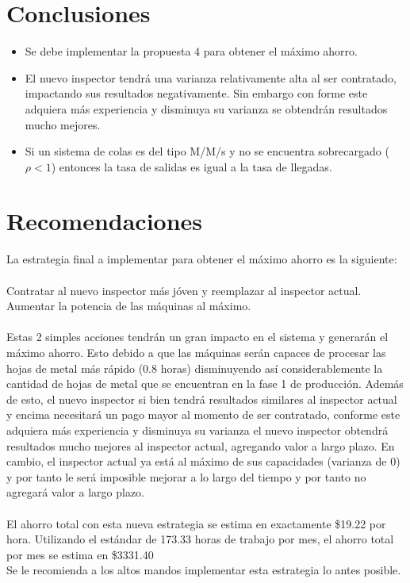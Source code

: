 \documentclass{article}
\begin{document}
\section{Conclusiones}
\begin{itemize}
	\item Se debe implementar la propuesta 4 para obtener el máximo ahorro.
	\item El nuevo inspector tendrá una varianza relativamente alta al
		ser contratado, impactando sus resultados negativamente. Sin embargo
		con forme este adquiera más experiencia y disminuya su varianza
		se obtendrán resultados mucho mejores.
	\item Si un sistema de colas es del tipo M/M/s y 
		no se encuentra sobrecargado ($\rho < 1$)
		entonces la tasa de salidas es igual a la tasa de llegadas.
\end{itemize}
\section{Recomendaciones}
La estrategia final a implementar para obtener el máximo ahorro es la siguiente:\\\\
Contratar al nuevo inspector más jóven y reemplazar al inspector actual. 
Aumentar la potencia de las máquinas al máximo.\\\\
Estas 2 simples acciones tendrán un gran impacto en el sistema y generarán el máximo 
ahorro. Esto debido a que las máquinas serán capaces de procesar las hojas 
de metal más rápido (0.8 horas) disminuyendo así considerablemente la cantidad
de hojas de metal que se encuentran en la fase 1 de producción. Además de esto,
el nuevo inspector si bien tendrá resultados similares al inspector actual y encima
necesitará un pago mayor al momento de ser contratado, conforme este adquiera más
experiencia y disminuya su varianza el nuevo inspector obtendrá resultados 
mucho mejores al inspector actual, agregando valor a largo plazo. En cambio, 
el inspector actual ya está al máximo de sus capacidades (varianza de 0) y por 
tanto le será imposible mejorar a lo largo del tiempo y por tanto no agregará
valor a largo plazo. \\\\
El ahorro total con esta nueva estrategia se estima en 
exactamente \$19.22 por hora. Utilizando el estándar de 173.33 horas de trabajo
por mes, el ahorro total por mes se estima en \$3331.40\\
Se le recomienda a los altos mandos implementar esta estrategia lo antes posible.
\clearpage
\end{document}
